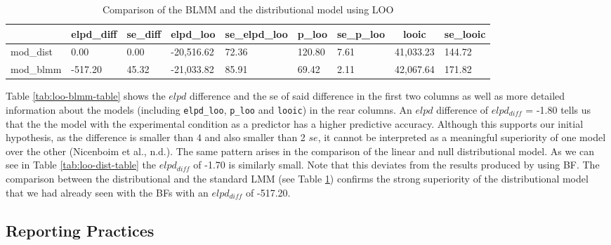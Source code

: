 \documentclass[
  doc,12pt,floatsintext]{apa7}
\begin{document}
\begin{table}[tbp]

\begin{center}
\begin{threeparttable}

\caption{\label{tab:loo-blmm-dist-table}Comparison of the BLMM and the distributional model using LOO}

\begin{tabular}{lllllllll}
\toprule
 & \multicolumn{1}{c}{elpd\_diff} & \multicolumn{1}{c}{se\_diff} & \multicolumn{1}{c}{elpd\_loo} & \multicolumn{1}{c}{se\_elpd\_loo} & \multicolumn{1}{c}{p\_loo} & \multicolumn{1}{c}{se\_p\_loo} & \multicolumn{1}{c}{looic} & \multicolumn{1}{c}{se\_looic}\\
\midrule
mod\_dist & 0.00 & 0.00 & -20,516.62 & 72.36 & 120.80 & 7.61 & 41,033.23 & 144.72\\
mod\_blmm & -517.20 & 45.32 & -21,033.82 & 85.91 & 69.42 & 2.11 & 42,067.64 & 171.82\\
\bottomrule
\end{tabular}

\end{threeparttable}
\end{center}

\end{table}

Table \ref{tab:loo-blmm-table} shows the \(elpd\) difference and the se of said difference in the first two columns as well as more detailed information about the models (including \texttt{elpd\_loo}, \texttt{p\_loo} and \texttt{looic}) in the rear columns. An \(elpd\) difference of \(elpd_{diff}\) = -1.80 tells us that the the model with the experimental condition as a predictor has a higher predictive accuracy. Although this supports our initial hypothesis, as the difference is smaller than 4 and also smaller than 2 \(se\), it cannot be interpreted as a meaningful superiority of one model over the other (Nicenboim et al., n.d.). The same pattern arises in the comparison of the linear and null distributional model. As we can see in Table \ref{tab:loo-dist-table} the \(elpd_{diff}\) of -1.70 is similarly small. Note that this deviates from the results produced by using BF. The comparison between the distributional and the standard LMM (see Table \ref{tab:loo-blmm-dist-table}) confirms the strong superiority of the distributional model that we had already seen with the BFs with an \(elpd_{diff}\) of -517.20.

\subsection{Reporting Practices}\label{reporting-practices}
\end{document}
